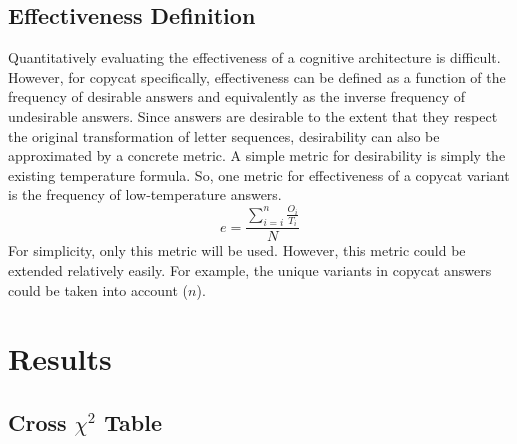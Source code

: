 \documentclass[a4paper]{article}
\begin{document}
    \subsection{Effectiveness Definition}

        Quantitatively evaluating the effectiveness of a cognitive architecture is difficult.
        However, for copycat specifically, effectiveness can be defined as a function of the frequency of desirable answers and equivalently as the inverse frequency of undesirable answers.
        Since answers are desirable to the extent that they respect the original transformation of letter sequences, desirability can also be approximated by a concrete metric.
        A simple metric for desirability is simply the existing temperature formula.
        So, one metric for effectiveness of a copycat variant is the frequency of low-temperature answers.
        $$e = \frac{\sum_{i=i}^{n} \frac{O_i}{T_i}}{N} $$
        For simplicity, only this metric will be used.
        However, this metric could be extended relatively easily.
        For example, the unique variants in copycat answers could be taken into account ($n$).
       
\section{Results}

    \subsection{Cross $\chi^2$ Table}
\end{document}
